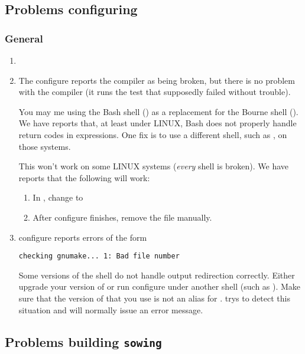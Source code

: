 {\subsection{Problems configuring}

\subsubsection{General}
\begin{enumerate}
\item 

\item 
\question 
The configure reports the compiler as being broken, but there is
no problem with the compiler (it runs the test that supposedly failed without
trouble).

\answer 
You may me using the Bash shell () as a replacement for
the Bourne shell ().  We have reports that, at least under
LINUX, Bash does not properly handle return codes in expressions.  One fix is
to use a different shell, such as , on those systems.

This won't work on some LINUX systems ({\em every} shell is broken).  We have
reports that the following will work:
\begin{enumerate}
\item In , change  to 
\item After configure finishes, remove the file  manually.
\end{enumerate}

\item 
\question 
configure reports errors of the form
\begin{verbatim} 
checking gnumake... 1: Bad file number
\end{verbatim}

\answer 
Some versions of the  shell do not handle output redirection
correctly.  Either upgrade your version of  or run configure under
another shell (such as ).  Make sure that the version of
 that you use is not an alias for .   
trys to detect this situation and will normally issue an error message.

\end{enumerate}

\subsection{Problems building {\tt sowing}}
}
